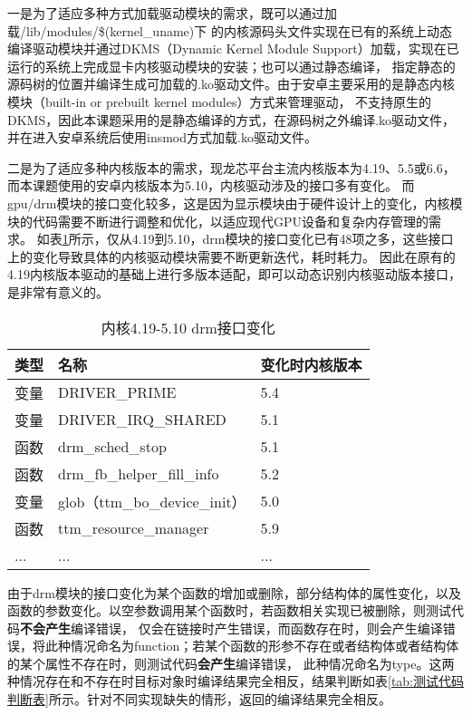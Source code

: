 一是为了适应多种方式加载驱动模块的需求，既可以通过加载/lib/modules/\$(kernel\_uname)下
的内核源码头文件实现在已有的系统上动态编译驱动模块并通过DKMS（Dynamic Kernel Module Support）加载，实现在已运行的系统上完成显卡内核驱动模块的安装；也可以通过静态编译，
指定静态的源码树的位置并编译生成可加载的.ko驱动文件。由于安卓主要采用的是静态内核模块（built-in or prebuilt kernel modules）方式来管理驱动，
不支持原生的DKMS，因此本课题采用的是静态编译的方式，在源码树之外编译.ko驱动文件，并在进入安卓系统后使用insmod方式加载.ko驱动文件。

二是为了适应多种内核版本的需求，现龙芯平台主流内核版本为4.19、5.5或6.6，而本课题使用的安卓内核版本为5.10，内核驱动涉及的接口多有变化。
而gpu/drm模块的接口变化较多，这是因为显示模块由于硬件设计上的变化，内核模块的代码需要不断进行调整和优化，以适应现代GPU设备和复杂内存管理的需求。
如表\ref{tab:内核4.19-5.10 drm接口变化}所示，仅从4.19到5.10，drm模块的接口变化已有48项之多，这些接口上的变化导致具体的内核驱动模块需要不断更新迭代，耗时耗力。
因此在原有的4.19内核版本驱动的基础上进行多版本适配，即可以动态识别内核驱动版本接口，是非常有意义的。

\begin{table}[h]
  \centering
  \caption{内核4.19-5.10 drm接口变化}
  \label{tab:内核4.19-5.10 drm接口变化}
  \begin{tabular}{lll}
    \toprule
    类型   &   名称  &变化时内核版本  \\
    \midrule
    变量 & DRIVER\_PRIME & 5.4 \\
    变量 & DRIVER\_IRQ\_SHARED & 5.1 \\
    函数 & drm\_sched\_stop & 5.1 \\
    函数 & drm\_fb\_helper\_fill\_info & 5.2 \\
    变量 & glob（ttm\_bo\_device\_init） & 5.0 \\
    函数 & ttm\_resource\_manager & 5.9 \\
    ... & ... & ... \\
    \bottomrule
  \end{tabular}
\end{table}

由于drm模块的接口变化为某个函数的增加或删除，部分结构体的属性变化，以及函数的参数变化。以空参数调用某个函数时，若函数相关实现已被删除，则测试代码\textbf{不会产生}编译错误，
仅会在链接时产生错误，而函数存在时，则会产生编译错误，将此种情况命名为function；若某个函数的形参不存在或者结构体或者结构体的某个属性不存在时，则测试代码\textbf{会产生}编译错误，
此种情况命名为type。这两种情况存在和不存在时目标对象时编译结果完全相反，结果判断如表\ref{tab:测试代码判断表}所示。针对不同实现缺失的情形，返回的编译结果完全相反。

